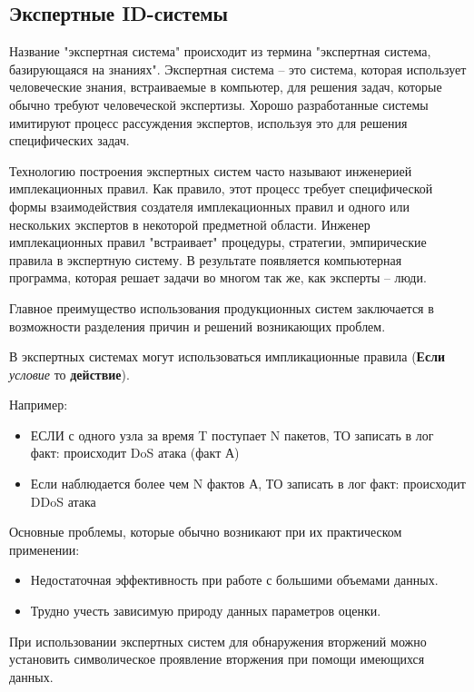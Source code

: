 \subsection{Экспертные ID-системы}

Название "экспертная система" происходит из термина "экспертная система, базирующаяся на знаниях". Экспертная система – это система, которая использует человеческие знания, встраиваемые в компьютер, для решения задач, которые обычно требуют человеческой экспертизы. Хорошо разработанные системы имитируют процесс рассуждения экспертов, используя это для решения специфических задач.

Технологию построения экспертных систем часто называют инженерией имплекационных правил. Как правило,
этот процесс требует специфической формы взаимодействия создателя имплекационных правил и одного
или нескольких экспертов в некоторой предметной области. Инженер имплекационных правил "встраивает"
процедуры, стратегии, эмпирические правила в экспертную систему. В результате появляется
компьютерная программа, которая решает задачи во многом так же, как эксперты -- люди.
\autocite{IDSystem}

Главное преимущество использования продукционных систем заключается в возможности разделения причин и
решений возникающих проблем.

В экспертных системах могут использоваться импликационные правила (\textbf{Если} \textit{условие} то
\textbf{действие}).

Например:
\begin{itemize}
	\item ЕСЛИ с одного узла за время T поступает N пакетов, ТО записать в лог факт:
	происходит DoS атака (факт А)

	\item Если наблюдается более чем N фактов А, ТО записать в лог факт: происходит DDoS атака
\end{itemize}

Основные проблемы, которые обычно возникают при их практическом применении:
\begin{itemize}
    \item Недостаточная эффективность при работе с большими объемами данных.
    \item Трудно учесть зависимую природу данных параметров оценки.
\end{itemize}

При использовании экспертных систем для обнаружения вторжений можно установить символическое
проявление вторжения при помощи имеющихся данных.

